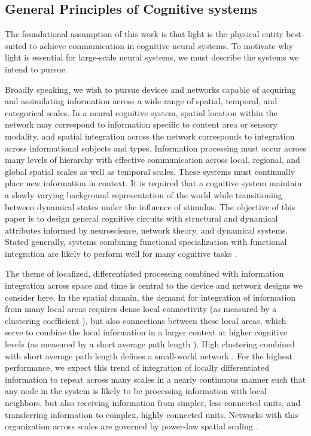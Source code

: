 \documentclass[twocolumn]{article}
\begin{document}
\subsection{\label{sec:cognitiveSystems}General Principles of Cognitive systems}
The foundational assumption of this work is that light is the physical entity best-suited to achieve communication in cognitive neural systems. To motivate why light is essential for large-scale neural systems, we must describe the systems we intend to pursue.

Broadly speaking, we wish to pursue devices and networks capable of acquiring and assimilating information across a wide range of spatial, temporal, and categorical scales. In a neural cognitive system, spatial location within the network may correspond to information specific to content area or sensory modality, and spatial integration across the network corresponds to integration across informational subjects and types. Information processing must occur across many levels of hierarchy with effective communication across local, regional, and global spatial scales as well as temporal scales. These systems must continually place new information in context. It is required that a cognitive system maintain a slowly varying background representation of the world while transitioning between dynamical states under the influence of stimulus. The objective of this paper is to design general cognitive circuits with structural and dynamical attributes informed by neuroscience, network theory, and dynamical systems. Stated generally, systems combining functional specialization with functional integration are likely to perform well for many cognitive tasks \cite{spto2000,spto2002}.

The theme of localized, differentiated processing combined with information integration \cite{toed1998,tosp2003,to2004,seiz2006,bato2008,bato2009,base2011} across space \cite{busp2009,sp2010} and time \cite{sase2001,vala2001,enfr2001,budr2004,bu2006} is central to the device and network designs we consider here. In the spatial domain, the demand for integration of information from many local areas requires dense local connectivity (as measured by a clustering coefficient \cite{eskn2015,saki2007,fa2007}), but also connections between these local areas, which serve to combine the local information in a larger context at higher cognitive levels \cite{brto2006} (as measured by a short average path length \cite{alba2002}). High clustering combined with short average path length defines a small-world network \cite{wast1998}. For the highest performance, we expect this trend of integration of locally differentiated information to repeat across many scales in a nearly continuous manner \cite{busp2009,sp2010} such that any node in the system is likely to be processing information with local neighbors, but also receiving information from simpler, less-connected units, and transferring information to complex, highly connected units. Networks with this organization across scales are governed by power-law spatial scaling \cite{baal1999}.
\end{document}
